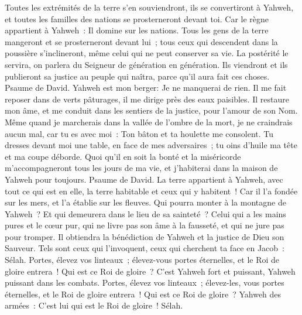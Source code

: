 \begin{multicols}{2}
Toutes les extrémités de la terre s'en souviendront, ils se convertiront à Yahweh, et toutes les familles des nations se prosterneront devant toi.
Car le règne appartient à Yahweh~: Il domine sur les nations.
Tous les gens de la terre mangeront et se prosterneront devant lui~; tous ceux qui descendent dans la poussière s'inclineront, même celui qui ne peut conserver sa vie.
La postérité le servira, on parlera du Seigneur de génération en génération.
Ils viendront et ils publieront sa justice au peuple qui naîtra, parce qu'il aura fait ces choses.
\VerseOne{}Psaume de David. Yahweh est mon berger: Je ne manquerai de rien.
Il me fait reposer dans de verts pâturages, il me dirige près des eaux paisibles.
Il restaure mon âme, et me conduit dans les sentiers de la justice, pour l'amour de son Nom.
Même quand je marcherais dans la vallée de l'ombre de la mort, je ne craindrais aucun mal, car tu es avec moi~: Ton bâton et ta houlette me consolent.
Tu dresses devant moi une table, en face de mes adversaires~; tu oins d'huile ma tête et ma coupe déborde.
Quoi qu'il en soit la bonté et la miséricorde m'accompagneront tous les jours de ma vie, et j'habiterai dans la maison de Yahweh pour toujours.
\VerseOne{}Psaume de David. La terre appartient à Yahweh, avec tout ce qui est en elle, la terre habitable et ceux qui y habitent~!
Car il l'a fondée sur les mers, et l'a établie sur les fleuves.
Qui pourra monter à la montagne de Yahweh~? Et qui demeurera dans le lieu de sa sainteté~?
Celui qui a les mains pures et le cœur pur, qui ne livre pas son âme à la fausseté, et qui ne jure pas pour tromper.
Il obtiendra la bénédiction de Yahweh et la justice de Dieu son Sauveur.
Tels sont ceux qui l'invoquent, ceux qui cherchent ta face en Jacob~: Sélah.
Portes, élevez vos linteaux~; élevez-vous portes éternelles, et le Roi de gloire entrera~!
Qui est ce Roi de gloire~? C'est Yahweh fort et puissant, Yahweh puissant dans les combats.
Portes, élevez vos linteaux~; élevez-les, vous portes éternelles, et le Roi de gloire entrera~!
Qui est ce Roi de gloire~? Yahweh des armées~: C'est lui qui est le Roi de gloire~! Sélah.

\end{multicols}
